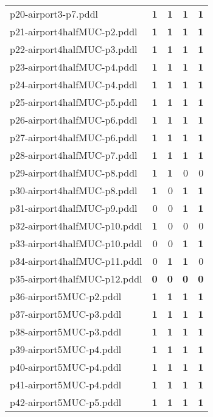 \documentclass{article}
\begin{document}
\begin{tabular}{@{}lrrrr@{}}
p20-airport3-p7.pddl & \textbf{1} & \textbf{1} & \textbf{1} & \textbf{1} \\
p21-airport4halfMUC-p2.pddl & \textbf{1} & \textbf{1} & \textbf{1} & \textbf{1} \\
p22-airport4halfMUC-p3.pddl & \textbf{1} & \textbf{1} & \textbf{1} & \textbf{1} \\
p23-airport4halfMUC-p4.pddl & \textbf{1} & \textbf{1} & \textbf{1} & \textbf{1} \\
p24-airport4halfMUC-p4.pddl & \textbf{1} & \textbf{1} & \textbf{1} & \textbf{1} \\
p25-airport4halfMUC-p5.pddl & \textbf{1} & \textbf{1} & \textbf{1} & \textbf{1} \\
p26-airport4halfMUC-p6.pddl & \textbf{1} & \textbf{1} & \textbf{1} & \textbf{1} \\
p27-airport4halfMUC-p6.pddl & \textbf{1} & \textbf{1} & \textbf{1} & \textbf{1} \\
p28-airport4halfMUC-p7.pddl & \textbf{1} & \textbf{1} & \textbf{1} & \textbf{1} \\
p29-airport4halfMUC-p8.pddl & \textbf{1} & \textbf{1} & 0 & 0 \\
p30-airport4halfMUC-p8.pddl & \textbf{1} & 0 & \textbf{1} & \textbf{1} \\
p31-airport4halfMUC-p9.pddl & 0 & 0 & \textbf{1} & \textbf{1} \\
p32-airport4halfMUC-p10.pddl & \textbf{1} & 0 & 0 & 0 \\
p33-airport4halfMUC-p10.pddl & 0 & 0 & \textbf{1} & \textbf{1} \\
p34-airport4halfMUC-p11.pddl & 0 & \textbf{1} & \textbf{1} & 0 \\
p35-airport4halfMUC-p12.pddl & \textbf{0} & \textbf{0} & \textbf{0} & \textbf{0} \\
p36-airport5MUC-p2.pddl & \textbf{1} & \textbf{1} & \textbf{1} & \textbf{1} \\
p37-airport5MUC-p3.pddl & \textbf{1} & \textbf{1} & \textbf{1} & \textbf{1} \\
p38-airport5MUC-p3.pddl & \textbf{1} & \textbf{1} & \textbf{1} & \textbf{1} \\
p39-airport5MUC-p4.pddl & \textbf{1} & \textbf{1} & \textbf{1} & \textbf{1} \\
p40-airport5MUC-p4.pddl & \textbf{1} & \textbf{1} & \textbf{1} & \textbf{1} \\
p41-airport5MUC-p4.pddl & \textbf{1} & \textbf{1} & \textbf{1} & \textbf{1} \\
p42-airport5MUC-p5.pddl & \textbf{1} & \textbf{1} & \textbf{1} & \textbf{1} \\

\end{tabular}
\end{document}
